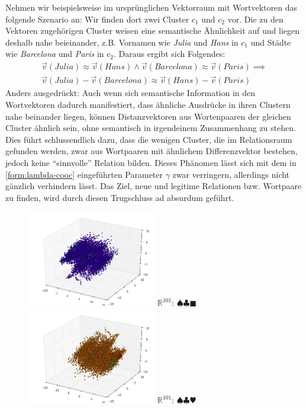 \begin{itemize}
  Nehmen wir beispielsweise im ursprünglichen Vektorraum mit Wortvektoren das folgende Szenario an: Wir finden dort
  zwei Cluster $c_1$ und $c_2$ vor. Die zu den Vektoren zugehörigen Cluster weisen eine semantische Ähnlichkeit auf
  und liegen deshalb nahe beieinander, z.B. Vornamen wie \emph{Julia} und \emph{Hans} in $c_1$ und Städte wie
  \emph{Barcelona} und \emph{Paris} in $c_2$. Daraus ergibt sich Folgendes:
  \begin{equation}
    \begin{split}
      \vec{v}(Julia) \approx \vec{v}(Hans) \land \vec{v}(Barcelona) \approx \vec{v}(Paris) \implies \\
      \vec{v}(Julia) - \vec{v}(Barcelona) \approx \vec{v}(Hans) - \vec{v}(Paris)
    \end{split}
  \end{equation}
  Anders ausgedrückt: Auch wenn sich semantische Information in den Wortvektoren dadurch manifestiert, dass ähnliche
  Ausdrücke in ihren Clustern nahe beinander liegen, können Distanzvektoren aus Wortenpaaren der gleichen Cluster ähnlich sein,
  ohne semantisch in irgendeinem Zusammenhang zu stehen. Dies führt schlussendlich dazu, dass die wenigen Cluster, die
  im Relationsraum gefunden werden, zwar aus Wortpaaren mit ähnlichem Differenzvektor bestehen, jedoch keine ``sinnvolle''
  Relation bilden. Dieses Phänomen lässt sich mit dem in \ref{form:lambda-cooc} eingeführten Parameter $\gamma$ zwar verringern, allerdings nicht gänzlich
  verhindern lässt. Das Ziel, neue und legitime Relationen bzw. Wortpaare zu finden, wird durch diesen Trugschluss ad absurdum geführt.

\begin{figure}[h]
  \centering
  \begin{multicols}{2}
    \includegraphics[width=0.5\textwidth]{../img/clusters_occ100_cos.jpg}
    $\mathbb{R}^{101}$: $\spadesuit\clubsuit\blacksquare$
    \includegraphics[width=0.5\textwidth]{../img/clusters_occ100_eucl.jpg}
    $\mathbb{R}^{101}$: $\spadesuit\clubsuit\varheart$


\end{multicols}
\end{figure}
\end{itemize}
